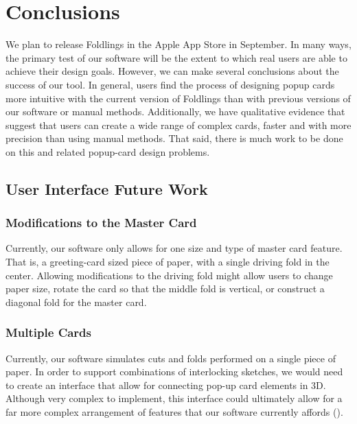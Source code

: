 \chapter{Conclusions}

We plan to release Foldlings in the Apple App Store in September. In
many ways, the primary test of our software will be the extent to which
real users are able to achieve their design goals. However, we can make
several conclusions about the success of our tool. In general, users
find the process of designing popup cards more intuitive with the
current version of Foldlings than with previous versions of our software
or manual methods. Additionally, we have qualitative evidence that
suggest that users can create a wide range of complex cards, faster and
with more precision than using manual methods. That said, there is much
work to be done on this and related popup-card design problems.

\section{User Interface Future Work}\label{user-interface-future-work}

\subsection{Modifications to the Master
Card}\label{modifications-to-the-master-card}

Currently, our software only allows for one size and type of master card
feature. That is, a greeting-card sized piece of paper, with a single
driving fold in the center. Allowing modifications to the driving fold
might allow users to change paper size, rotate the card so that the
middle fold is vertical, or construct a diagonal fold for the master
card.

\subsection{Multiple Cards}\label{multiple-cards}

Currently, our software simulates cuts and folds performed on a single
piece of paper. In order to support combinations of interlocking
sketches, we would need to create an interface that allow for connecting
pop-up card elements in 3D. Although very complex to implement, this
interface could ultimately allow for a far more complex arrangement of
features that our software currently affords (\citet{hart2007modular}).

